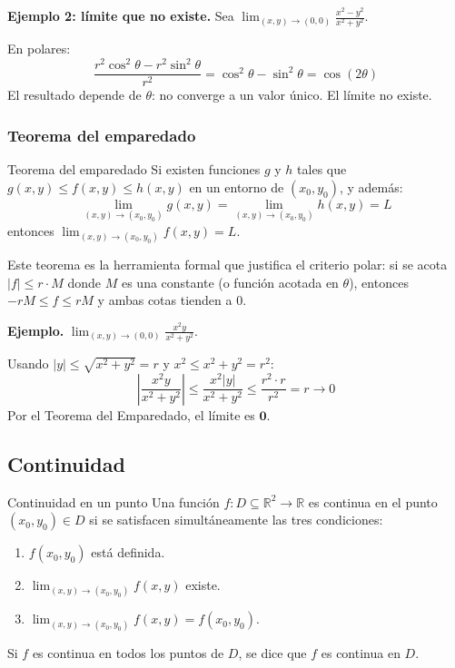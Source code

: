 \textbf{Ejemplo 2: límite que no existe.} Sea $\displaystyle\lim_{(x,y)\to(0,0)}\frac{x^2 - y^2}{x^2+y^2}$.

En polares:
\[ \frac{r^2\cos^2\theta - r^2\sin^2\theta}{r^2} = \cos^2\theta - \sin^2\theta = \cos(2\theta) \]
El resultado depende de $\theta$: no converge a un valor único. El límite no existe.

\subsubsection{Teorema del emparedado}

\begin{mytheorem}{Teorema del emparedado}
Si existen funciones $g$ y $h$ tales que $g(x,y) \leq f(x,y) \leq h(x,y)$ en un entorno de $(x_0,y_0)$, y además:
\[ \lim_{(x,y)\to(x_0,y_0)} g(x,y) = \lim_{(x,y)\to(x_0,y_0)} h(x,y) = L \]
entonces $\displaystyle\lim_{(x,y)\to(x_0,y_0)} f(x,y) = L$.
\end{mytheorem}

Este teorema es la herramienta formal que justifica el criterio polar: si se acota $|f| \leq r \cdot M$ donde $M$ es una constante (o función acotada en $\theta$), entonces $-rM \leq f \leq rM$ y ambas cotas tienden a $0$.

\textbf{Ejemplo.} $\displaystyle\lim_{(x,y)\to(0,0)} \frac{x^2 y}{x^2+y^2}$.

Usando $|y| \leq \sqrt{x^2 + y^2} = r$ y $x^2 \leq x^2 + y^2 = r^2$:
\[ \left|\frac{x^2 y}{x^2+y^2}\right| \leq \frac{x^2 |y|}{x^2+y^2} \leq \frac{r^2 \cdot r}{r^2} = r \to 0 \]
Por el Teorema del Emparedado, el límite es $\mathbf{0}$.

\subsection{Continuidad}

\begin{mydefinition}{Continuidad en un punto}
Una función $f: D \subseteq \mathbb{R}^2 \to \mathbb{R}$ es continua en el punto $(x_0, y_0) \in D$ si se satisfacen simultáneamente las tres condiciones:
\begin{enumerate}
    \item $f(x_0, y_0)$ está definida.
    \item $\displaystyle\lim_{(x,y)\to(x_0,y_0)} f(x,y)$ existe.
    \item $\displaystyle\lim_{(x,y)\to(x_0,y_0)} f(x,y) = f(x_0, y_0)$.
\end{enumerate}
Si $f$ es continua en todos los puntos de $D$, se dice que $f$ es continua en $D$.
\end{mydefinition}

